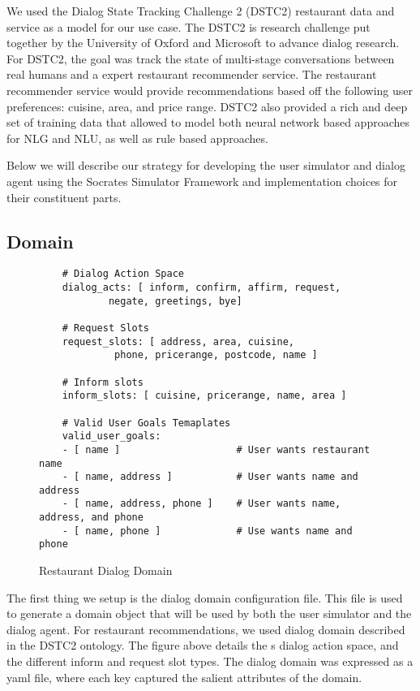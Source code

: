 We used the Dialog State Tracking Challenge 2 (DSTC2) restaurant data and service as a model for our use case. The DSTC2 is research challenge put together by the University of Oxford and Microsoft to advance dialog research. For DSTC2, the goal was track the state of multi-stage conversations between real humans and a expert restaurant recommender service. The restaurant recommender service would provide recommendations based off the following user preferences: cuisine, area, and price range. DSTC2 also provided a rich and deep set of training data that allowed to model both neural network based approaches for NLG and NLU, as well as rule based approaches. 

Below we will describe our strategy for developing the user simulator and dialog agent using the Socrates Simulator Framework and implementation choices for their constituent parts. 

\subsection{Domain}

\begin{figure}[h!]
	\caption{ Restaurant Dialog Domain}
	\label{fig:restaurant_domain}
	\begin{lstlisting}
	# Dialog Action Space
	dialog_acts: [ inform, confirm, affirm, request, 
			negate, greetings, bye]
	
	# Request Slots
	request_slots: [ address, area, cuisine, 
			 phone, pricerange, postcode, name ]
	
	# Inform slots
	inform_slots: [ cuisine, pricerange, name, area ]
	
	# Valid User Goals Temaplates
	valid_user_goals:
	- [ name ]                    # User wants restaurant name
	- [ name, address ]           # User wants name and address
	- [ name, address, phone ]    # User wants name, address, and phone
	- [ name, phone ]             # Use wants name and phone
	\end{lstlisting}
\end{figure}
The first thing we setup is the dialog domain configuration file. This file is used to generate a domain object that will be used by both the user simulator and the dialog agent. For restaurant recommendations, we used dialog domain described in the DSTC2 ontology. The figure above details the s dialog action space, and the different inform and request slot types. The dialog domain was expressed as a yaml file, where each key captured the salient attributes of the domain. 


